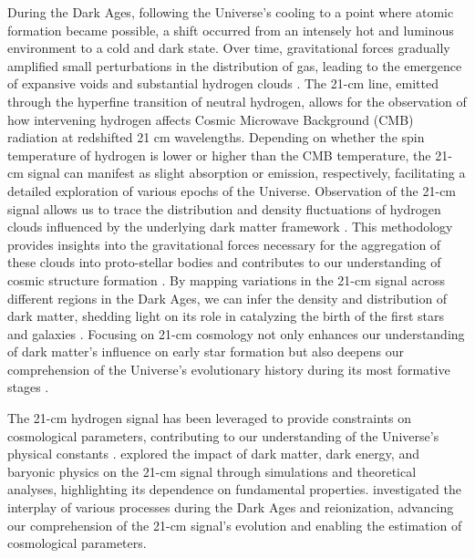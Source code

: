 \documentclass[fleqn,usenatbib]{rasti}
\begin{document}
During the Dark Ages, following the Universe's cooling to a point where atomic formation became possible, a shift occurred from an intensely hot and luminous environment to a cold and dark state. Over time, gravitational forces gradually amplified small perturbations in the distribution of gas, leading to the emergence of expansive voids and substantial hydrogen clouds \citep{Peebles1981}. The 21-cm line, emitted through the hyperfine transition of neutral hydrogen, allows for the observation of how intervening hydrogen affects Cosmic Microwave Background (CMB) radiation at redshifted 21 cm wavelengths. Depending on whether the spin temperature of hydrogen is lower or higher than the CMB temperature, the 21-cm signal can manifest as slight absorption or emission, respectively, facilitating a detailed exploration of various epochs of the Universe. Observation of the 21-cm signal allows us to trace the distribution and density fluctuations of hydrogen clouds influenced by the underlying dark matter framework \citep{Morales2010}. This methodology provides insights into the gravitational forces necessary for the aggregation of these clouds into proto-stellar bodies and contributes to our understanding of cosmic structure formation \citep{Barkana2016}. By mapping variations in the 21-cm signal across different regions in the Dark Ages, we can infer the density and distribution of dark matter, shedding light on its role in catalyzing the birth of the first stars and galaxies \citep{Pritchard2012}. Focusing on 21-cm cosmology not only enhances our understanding of dark matter's influence on early star formation but also deepens our comprehension of the Universe's evolutionary history during its most formative stages \citep{Cohen2017}.

The 21-cm hydrogen signal has been leveraged to provide constraints on cosmological parameters, contributing to our understanding of the Universe's physical constants \citep{reis2020}. \citet{Chen2004} explored the impact of dark matter, dark energy, and baryonic physics on the 21-cm signal through simulations and theoretical analyses, highlighting its dependence on fundamental properties. \citet{Furlanetto2006} investigated the interplay of various processes during the Dark Ages and reionization, advancing our comprehension of the 21-cm signal's evolution and enabling the estimation of cosmological parameters.
\end{document}
